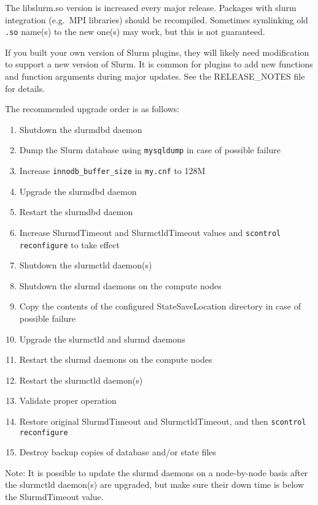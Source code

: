 The libslurm.so version is increased every major release. Packages with slurm integration (e.g.\ MPI libraries) should be recompiled. Sometimes symlinking old \texttt{.so} name(s) to the new one(s) may work, but this is not guaranteed.

If you built your own version of Slurm plugins, they will likely need modification to support a new version of Slurm. It is common for plugins to add new functions and function arguments during major updates. See the RELEASE\_NOTES file for details.

The recommended upgrade order is as follows:

    \begin{enumerate}
    \item Shutdown the slurmdbd daemon
    \item Dump the Slurm database using \texttt{mysqldump} in case of possible failure
    \item Increase \texttt{innodb\_buffer\_size} in \texttt{my.cnf} to 128M
    \item Upgrade the slurmdbd daemon
    \item Restart the slurmdbd daemon
    \item Increase SlurmdTimeout and SlurmctldTimeout values and \texttt{scontrol reconfigure} to take effect
    \item Shutdown the slurmctld daemon(s)
    \item Shutdown the slurmd daemons on the compute nodes
    \item Copy the contents of the configured StateSaveLocation directory in case of possible failure
    \item Upgrade the slurmctld and slurmd daemons
    \item Restart the slurmd daemons on the compute nodes
    \item Restart the slurmctld daemon(s)
    \item Validate proper operation
    \item Restore original SlurmdTimeout and SlurmctldTimeout, and then \texttt{scontrol reconfigure}
    \item Destroy backup copies of database and/or state files
    \end{enumerate}

Note: It is possible to update the slurmd daemons on a node-by-node basis after the slurmctld daemon(s) are upgraded, but make sure their down time is below the SlurmdTimeout value.
